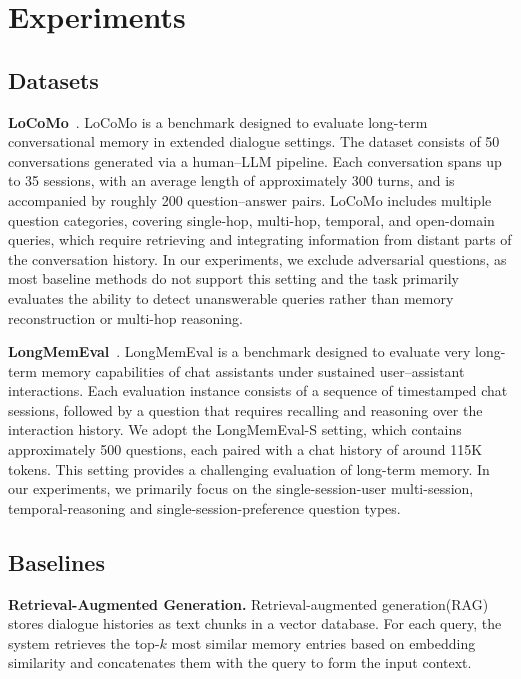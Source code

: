 \section{Experiments}
\label{app:experiments}
\subsection{Datasets}

\textbf{LoCoMo}~\cite{DBLP:conf/acl/MaharanaLTBBF24}.
LoCoMo is a benchmark designed to evaluate long-term conversational memory in extended dialogue settings.
The dataset consists of 50 conversations generated via a human--LLM pipeline.
Each conversation spans up to 35 sessions, with an average length of approximately 300 turns, and is accompanied by roughly 200 question--answer pairs.
LoCoMo includes multiple question categories, covering single-hop, multi-hop, temporal, and open-domain queries, which require retrieving and integrating information from distant parts of the conversation history.
In our experiments, we exclude adversarial questions, as most baseline methods do not support this setting and the task primarily evaluates the ability to detect unanswerable queries rather than memory reconstruction or multi-hop reasoning.

\textbf{LongMemEval}~\cite{DBLP:conf/iclr/WuWYZCY25}.
LongMemEval is a benchmark designed to evaluate very long-term memory capabilities of chat assistants under sustained user--assistant interactions.
Each evaluation instance consists of a sequence of timestamped chat sessions, followed by a question that requires recalling and reasoning over the interaction history.
We adopt the LongMemEval-S setting, which contains approximately 500 questions, each paired with a chat history of around 115K tokens.
This setting provides a challenging evaluation of long-term memory. In our experiments, we primarily focus on the single-session-user multi-session, temporal-reasoning and  single-session-preference question types.



\subsection{Baselines}
\textbf{Retrieval-Augmented Generation.}
Retrieval-augmented generation(RAG) stores dialogue histories as text chunks in a vector database.
For each query, the system retrieves the top-$k$ most similar memory entries based on embedding similarity and concatenates them with the query to form the input context.

